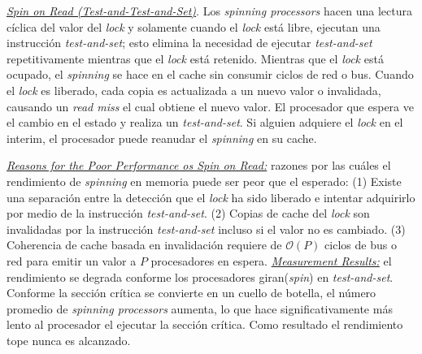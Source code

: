 \underline{\textit{Spin on Read (Test-and-Test-and-Set)}}. Los \textit{spinning processors} hacen una lectura cíclica del valor del \textit{lock} y solamente cuando el \textit{lock} está libre, ejecutan una instrucción \textit{test-and-set}; esto elimina la necesidad de ejecutar \textit{test-and-set} repetitivamente mientras que el \textit{lock} está retenido. Mientras que el \textit{lock} está ocupado, el \textit{spinning} se hace en el cache sin consumir ciclos de red o bus. Cuando el \textit{lock} es liberado, cada copia es actualizada a un nuevo valor o invalidada, causando un \textit{read miss} el cual obtiene el nuevo valor. El procesador que espera ve el cambio en el estado y realiza un \textit{test-and-set}. Si alguien adquiere el \textit{lock} en el interim, el procesador puede reanudar el \textit{spinning} en su cache. 

\underline{\textit{Reasons for the Poor Performance os Spin on Read:}} razones por las cuáles el rendimiento de \textit{spinning} en memoria puede ser peor que el esperado: (1) Existe una separación entre la detección que el \textit{lock} ha sido liberado e intentar adquirirlo por medio de la instrucción \textit{test-and-set}. (2) Copias de cache del \textit{lock} son invalidadas por la instrucción \textit{test-and-set} incluso si el valor no es cambiado. (3) Coherencia de cache basada en invalidación requiere de $\mathcal{O}(P)$ ciclos de bus o red para emitir un valor a $P$ procesadores en espera. \underline{\textit{Measurement Results:}} el rendimiento se degrada conforme los procesadores giran(\textit{spin}) en \textit{test-and-set}. Conforme la sección crítica se convierte en un cuello de botella, el número promedio de \textit{spinning processors} aumenta, lo que hace significativamente más lento al procesador el ejecutar la sección crítica. Como resultado el rendimiento tope nunca es alcanzado.

